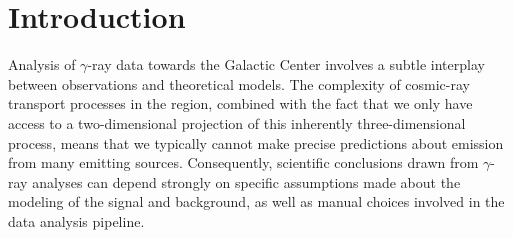 \documentclass[prd,aps,10pt,nofootinbib,twocolumn,superscriptaddress,preprintnumbers,balancelastpage,longbibliography,floatfix]{revtex4-2}
\begin{document}
\maketitle

\tableofcontents


\section{Introduction} 
\label{sec:intro}

Analysis of $\gamma$-ray data towards the Galactic Center involves a subtle interplay between observations and theoretical models. The complexity of cosmic-ray transport processes in the region, combined with the fact that we only have access to a two-dimensional projection of this inherently three-dimensional process, means that we typically cannot make precise predictions about emission from many emitting sources. Consequently, scientific conclusions drawn from $\gamma$-ray analyses can depend strongly on specific assumptions made about the modeling of the signal and background, as well as manual choices involved in the data analysis pipeline.
\end{document}
